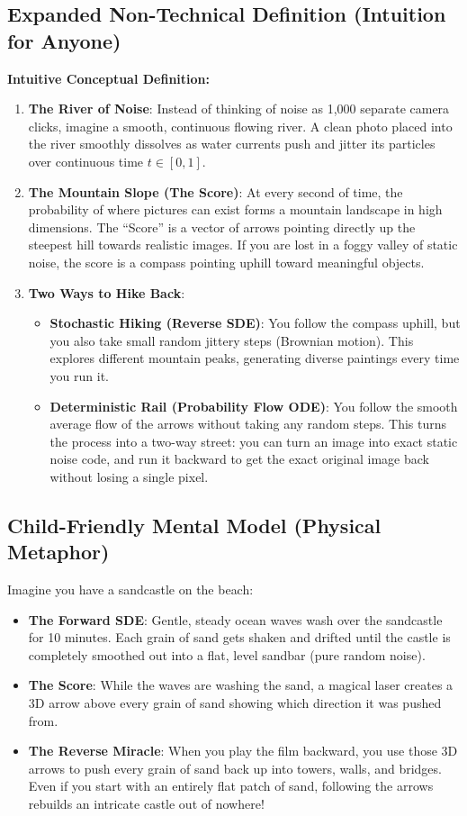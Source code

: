 \documentclass[11pt,a4paper]{article}
\theoremstyle{definition}
\begin{document}
\subsection{Expanded Non-Technical Definition (Intuition for Anyone)}
\textbf{Intuitive Conceptual Definition:}
\begin{enumerate}
    \item \textbf{The River of Noise}: Instead of thinking of noise as 1,000 separate camera clicks, imagine a smooth, continuous flowing river. A clean photo placed into the river smoothly dissolves as water currents push and jitter its particles over continuous time $t \in [0, 1]$.
    \item \textbf{The Mountain Slope (The Score)}: At every second of time, the probability of where pictures can exist forms a mountain landscape in high dimensions. The ``Score'' is a vector of arrows pointing directly up the steepest hill towards realistic images. If you are lost in a foggy valley of static noise, the score is a compass pointing uphill toward meaningful objects.
    \item \textbf{Two Ways to Hike Back}:
    \begin{itemize}
        \item \textbf{Stochastic Hiking (Reverse SDE)}: You follow the compass uphill, but you also take small random jittery steps (Brownian motion). This explores different mountain peaks, generating diverse paintings every time you run it.
        \item \textbf{Deterministic Rail (Probability Flow ODE)}: You follow the smooth average flow of the arrows without taking any random steps. This turns the process into a two-way street: you can turn an image into exact static noise code, and run it backward to get the exact original image back without losing a single pixel.
    \end{itemize}
\end{enumerate}

\subsection{Child-Friendly Mental Model (Physical Metaphor)}
Imagine you have a sandcastle on the beach:
\begin{itemize}
    \item \textbf{The Forward SDE}: Gentle, steady ocean waves wash over the sandcastle for 10 minutes. Each grain of sand gets shaken and drifted until the castle is completely smoothed out into a flat, level sandbar (pure random noise).
    \item \textbf{The Score}: While the waves are washing the sand, a magical laser creates a 3D arrow above every grain of sand showing which direction it was pushed from.
    \item \textbf{The Reverse Miracle}: When you play the film backward, you use those 3D arrows to push every grain of sand back up into towers, walls, and bridges. Even if you start with an entirely flat patch of sand, following the arrows rebuilds an intricate castle out of nowhere!
\end{itemize}
\end{document}

